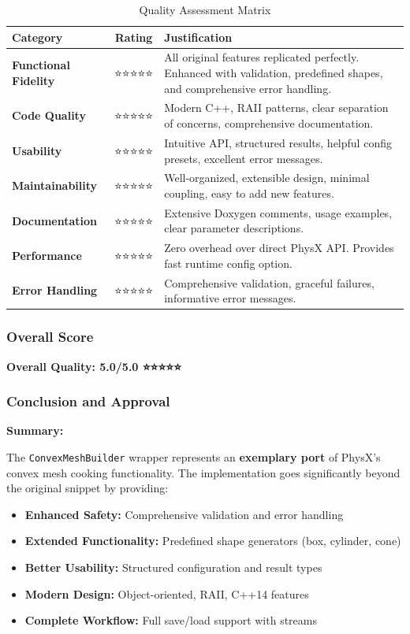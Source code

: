 \begin{table}[h]
\centering
\begin{tabular}{|l|c|p{7cm}|}
\hline
\textbf{Category} & \textbf{Rating} & \textbf{Justification} \\
\hline
\textbf{Functional Fidelity} & ⭐⭐⭐⭐⭐ & All original features replicated perfectly. Enhanced with validation, predefined shapes, and comprehensive error handling. \\
\hline
\textbf{Code Quality} & ⭐⭐⭐⭐⭐ & Modern C++, RAII patterns, clear separation of concerns, comprehensive documentation. \\
\hline
\textbf{Usability} & ⭐⭐⭐⭐⭐ & Intuitive API, structured results, helpful config presets, excellent error messages. \\
\hline
\textbf{Maintainability} & ⭐⭐⭐⭐⭐ & Well-organized, extensible design, minimal coupling, easy to add new features. \\
\hline
\textbf{Documentation} & ⭐⭐⭐⭐⭐ & Extensive Doxygen comments, usage examples, clear parameter descriptions. \\
\hline
\textbf{Performance} & ⭐⭐⭐⭐⭐ & Zero overhead over direct PhysX API. Provides fast runtime config option. \\
\hline
\textbf{Error Handling} & ⭐⭐⭐⭐⭐ & Comprehensive validation, graceful failures, informative error messages. \\
\hline
\end{tabular}
\caption{Quality Assessment Matrix}
\end{table}

\subsubsection{Overall Score}

\begin{center}
\Large
\textbf{Overall Quality: 5.0/5.0 ⭐⭐⭐⭐⭐}
\end{center}

\subsubsection{Conclusion and Approval}

\textbf{Summary:}

The \texttt{ConvexMeshBuilder} wrapper represents an \textbf{exemplary port} of PhysX's convex mesh cooking functionality. The implementation goes significantly beyond the original snippet by providing:

\begin{itemize}
    \item \textbf{Enhanced Safety:} Comprehensive validation and error handling
    \item \textbf{Extended Functionality:} Predefined shape generators (box, cylinder, cone)
    \item \textbf{Better Usability:} Structured configuration and result types
    \item \textbf{Modern Design:} Object-oriented, RAII, C++14 features
    \item \textbf{Complete Workflow:} Full save/load support with streams
\end{itemize}

